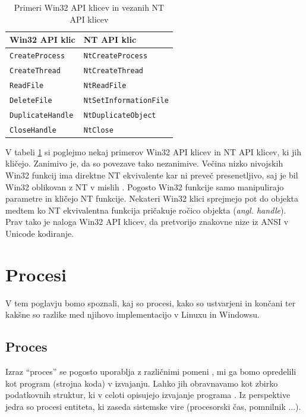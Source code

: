 \documentclass[a4paper,12pt,openright]{book}
\begin{document}
\begin{table}[h!]
	\begin{center}
		\begin{tabular}{ l|l }
			Win32 API klic         & NT API klic                 \\
			\hline
			\verb|CreateProcess|   & \verb|NtCreateProcess|      \\
			\verb|CreateThread|    & \verb|NtCreateThread|       \\
			\verb|ReadFile|        & \verb|NtReadFile|           \\
			\verb|DeleteFile|      & \verb|NtSetInformationFile| \\
			\verb|DuplicateHandle| & \verb|NtDuplicateObject|    \\
			\verb|CloseHandle|     & \verb|NtClose|              \\
		\end{tabular}
	\end{center}
	\caption{Primeri Win32 API klicev in vezanih NT API klicev \cite{Tanenbaum_Bos_2023}}
	\label{tab:example_win32_nt_mapping}
\end{table}

V tabeli \ref{tab:example_win32_nt_mapping} si poglejmo nekaj primerov Win32 API klicev in NT API klicev, ki jih kličejo.
Zanimivo je, da so povezave tako nezanimive.
Večina nizko nivojskih Win32 funkcij ima direktne NT ekvivalente kar ni preveč presenetljivo, saj je bil Win32 oblikovan z NT v mislih \cite{Tanenbaum_Bos_2023}.
Pogosto Win32 funkcije samo manipulirajo parametre in kličejo NT funkcije.
Nekateri Win32 klici sprejmejo pot do objekta medtem ko NT ekvivalentna funkcija pričakuje ročico objekta (\textit{angl. handle}).
Prav tako je naloga Win32 API klicev, da pretvorijo znakovne nize iz ANSI v Unicode kodiranje.

\chapter{Procesi}

V tem poglavju bomo spoznali, kaj so procesi, kako so ustvarjeni in končani ter kakšne so razlike med njihovo implementacijo v Linuxu in Windowsu.

\section{Proces}

Izraz ``proces'' se pogosto uporablja z različnimi pomeni \cite{Bovet_Cesati_2005}, mi ga bomo opredelili kot program (strojna koda) v izvajanju.
Lahko jih obravnavamo kot zbirko podatkovnih struktur, ki v celoti opisujejo izvajanje programa \cite{Bovet_Cesati_2005}.
Iz perspektive jedra so procesi entiteta, ki zaseda sistemske vire (procesorski čas, pomnilnik ...).
\end{document}
